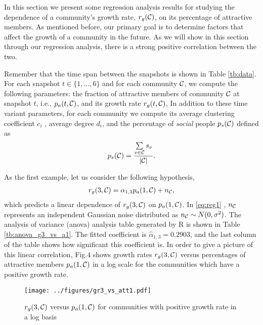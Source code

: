 In this section we present some regression analysis results for studying the dependence of a community's growth rate, $r_g(\mathcal{C})$, on its percentage of attractive members. As mentioned before, our primary  goal is to determine  factors that affect the growth of a community in the future.  As we will show in this section through our regression analysis, there is a strong  positive correlation between the two.

Remember that the time span between the snapshots is shown in Table \ref{tb:data}. For each snapshot $t\in\{1,\ldots,6\}$ and for each community $\mathcal{C}$, we compute the following parameters: the fraction of attractive members of community $\mathcal{C}$ at snapshot $t$, i.e., $p_a(t,\mathcal{C})$,  and its growth rate $r_g(t,\mathcal{C})$, In addition to these time variant parameters, for each community we compute its average clustering coefficient $c_i$ \cite{clustering}, average degree $d_i$, and the percentage of \emph{social} people $p_s(\mathcal{C})$ defined as
\begin{align}
p_s(\mathcal{C}) = \frac{\sum\limits_{v\in\mathcal{C}}s_v}{|\mathcal{C}|}.
\end{align}

As the first example, let us consider the following hypothesis,
\begin{align}
r_g(3,\mathcal{C}) = \alpha_{1,3}  p_a(1,\mathcal{C}) + n_{\mathcal{C}},\label{eq:reg1}
\end{align}
which predicts a linear dependence of $r_g(3,\mathcal{C})$ on $p_a(1,\mathcal{C})$.  In \eqref{eq:reg1} , $n_{\mathcal{C}}$ represents an independent Gaussian noise distributed as  $n_{\mathcal{C}} \sim N(0,\sigma^2)$. The analysis of variance (anova) analysis table generated by R is shown in Table \ref{tb:anova_g3_vs_a1}. The fitted coefficient is $\hat{\alpha}_{1,3}=0.2903$, and the last column of the table shows how significant this coefficient is. In order to give a picture of this linear correlation, Fig.4 shows  growth rates $r_g(3,\mathcal{C})$  versus percentages of attractive members $p_a(1,\mathcal{C})$ in a log scale for the communities which have a positive growth rate.
\begin{figure}
\begin{center}
\texttt{[image: ../figures/gr3\_vs\_att1.pdf]}
\caption{$r_g(3,\mathcal{C})$ versus $p_a(1,\mathcal{C})$ for communities with positive growth rate in a log basis}
\end{center}
\label{fig:g5_vs_a1}
\end{figure}

